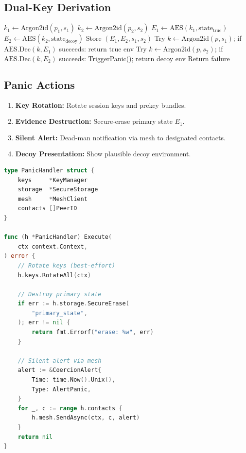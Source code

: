 \documentclass[11pt,a4paper]{article}
\begin{document}
\subsection{Dual-Key Derivation}

\begin{algorithm}[H]
\caption{Dual-Key Derivation}
\label{alg:dual-key}
\begin{algorithmic}[1]
    \State $k_1 \gets \mathrm{Argon2id}(p_1, s_1)$
    \State $k_2 \gets \mathrm{Argon2id}(p_2, s_2)$
    \State $E_1 \gets \mathrm{AES}(k_1, \mathrm{state}_{\mathrm{true}})$
    \State $E_2 \gets \mathrm{AES}(k_2, \mathrm{state}_{\mathrm{decoy}})$
    \State Store $(E_1, E_2, s_1, s_2)$
\EndProcedure
{}
    \State Try $k \gets \mathrm{Argon2id}(p, s_1)$;
        if $\mathrm{AES.Dec}(k, E_1)$ succeeds: return true env
    \State Try $k \gets \mathrm{Argon2id}(p, s_2)$;
        if $\mathrm{AES.Dec}(k, E_2)$ succeeds:
        \Statex \quad TriggerPanic(); return decoy env
    \State Return failure
\EndProcedure
\end{algorithmic}
\end{algorithm}

\subsection{Panic Actions}

\begin{enumerate}
    \item \textbf{Key Rotation:} Rotate session keys and prekey bundles.
    \item \textbf{Evidence Destruction:} Secure-erase primary state $E_1$.
    \item \textbf{Silent Alert:} Dead-man notification via mesh to
    designated contacts.
    \item \textbf{Decoy Presentation:} Show plausible decoy environment.
\end{enumerate}

\begin{lstlisting}[language=Go,caption={Panic Action Handler}]
type PanicHandler struct {
    keys     *KeyManager
    storage  *SecureStorage
    mesh     *MeshClient
    contacts []PeerID
}

func (h *PanicHandler) Execute(
    ctx context.Context,
) error {
    // Rotate keys (best-effort)
    h.keys.RotateAll(ctx)

    // Destroy primary state
    if err := h.storage.SecureErase(
        "primary_state",
    ); err != nil {
        return fmt.Errorf("erase: %w", err)
    }

    // Silent alert via mesh
    alert := &CoercionAlert{
        Time: time.Now().Unix(),
        Type: AlertPanic,
    }
    for _, c := range h.contacts {
        h.mesh.SendAsync(ctx, c, alert)
    }
    return nil
}
\end{lstlisting}
\end{document}
